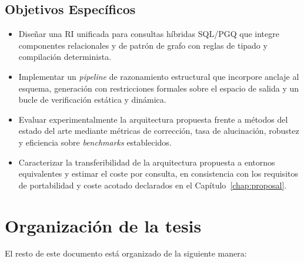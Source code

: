 \subsection{Objetivos Específicos}

\begin{itemize}
    \item Diseñar una \ac{RI} unificada para consultas híbridas \ac{SQL}/\ac{PGQ} que integre componentes relacionales y de patrón de grafo con reglas de tipado y compilación determinista.
    \item Implementar un \emph{pipeline} de razonamiento estructural que incorpore anclaje al esquema, generación con restricciones formales sobre el espacio de salida y un bucle de verificación estática y dinámica.
    \item Evaluar experimentalmente la arquitectura propuesta frente a métodos del estado del arte mediante métricas de corrección, tasa de alucinación, robustez y eficiencia sobre \emph{benchmarks} establecidos.
    \item Caracterizar la transferibilidad de la arquitectura propuesta a entornos equivalentes y estimar el coste por consulta, en consistencia con los requisitos de portabilidad y coste acotado declarados en el Capítulo~\ref{chap:proposal}.
\end{itemize}

\section{Organización de la tesis}
El resto de este documento está organizado de la siguiente manera:

